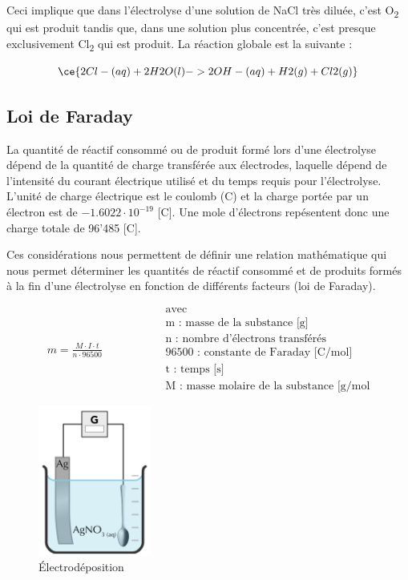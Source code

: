 \documentclass[
  11pt,
  a4paper,
  openany]{book}
\begin{document}
Ceci implique que dans l'électrolyse d'une solution de NaCl très diluée, c'est O\textsubscript{2} qui est produit tandis que, dans une solution plus concentrée, c'est presque exclusivement Cl\textsubscript{2} qui est produit. La réaction globale est la suivante :

\[
\ce{2 Cl-(aq) + 2 H2O(l) -> 2 OH-(aq) + H2(g) + Cl2(g)}
\]

\clearpage

\hypertarget{loi-de-faraday}{%
\subsection{Loi de Faraday}\label{loi-de-faraday}}

La quantité de réactif consommé ou de produit formé lors d'une électrolyse dépend de la quantité de charge transférée aux électrodes, laquelle dépend de l'intensité du courant électrique utilisé et du temps requis pour l'électrolyse. L'unité de charge électrique est le coulomb (C) et la charge portée par un électron est de \(-1.6022 \cdot 10^{-19}\) {[}C{]}. Une mole d'électrons repésentent donc une charge totale de 96'485 {[}C{]}.

Ces considérations nous permettent de définir une relation mathématique qui nous permet déterminer les quantités de réactif consommé et de produits formés à la fin d'une électrolyse en fonction de différents facteurs (loi de Faraday).

\[
\begin{split}
m = \frac{M \cdot I \cdot t}{n \cdot 96500}
\end{split}
\qquad\qquad
\begin{split}
&\text{avec} \\
&\text{m : masse de la substance [g]} \\
&\text{n : nombre d'électrons transférés} \\
&\text{96500 : constante de Faraday [C/mol]} \\
&\text{t : temps [s]} \\
&\text{M : masse molaire de la substance [g/mol}
\end{split}
\]

\clearpage

\begin{figure}
\centering
\includegraphics[width=10em,height=\textheight]{images/electrolysis-spoon.png}
\caption{Électrodéposition}
\end{figure}
\end{document}

